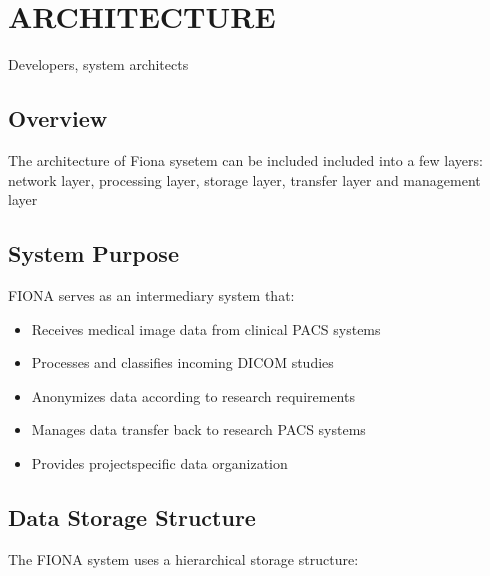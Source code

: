 \documentclass[letterpaper,10pt,english]{sphinxmanual}
\begin{document}
\sphinxstepscope


\chapter{ARCHITECTURE}
\label{\detokenize{Architecture/index:architecture}}\label{\detokenize{Architecture/index::doc}}
\sphinxAtStartPar
{} Developers, system architects


\section{Overview}
\label{\detokenize{Architecture/index:overview}}
\sphinxAtStartPar
The architecture of Fiona sysetem can be included included into a few layers: network layer, processing layer, storage layer, transfer layer and management layer



\section{System Purpose}
\label{\detokenize{Architecture/index:system-purpose}}
\sphinxAtStartPar
FIONA serves as an intermediary system that:
\begin{itemize}
\item {} 
\sphinxAtStartPar
Receives medical image data from clinical PACS systems

\item {} 
\sphinxAtStartPar
Processes and classifies incoming DICOM studies

\item {} 
\sphinxAtStartPar
Anonymizes data according to research requirements

\item {} 
\sphinxAtStartPar
Manages data transfer back to research PACS systems

\item {} 
\sphinxAtStartPar
Provides project\sphinxhyphen{}specific data organization

\end{itemize}


\section{Data Storage Structure}
\label{\detokenize{Architecture/index:data-storage-structure}}
\sphinxAtStartPar
The FIONA system uses a hierarchical storage structure:
\end{document}
